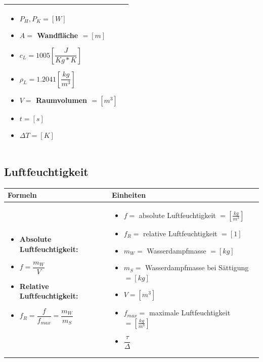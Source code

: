 \begin{table}[h!]
\begin{center}
\begin{tabular}{ | m{10cm} | m{8cm}  | }
\begin{itemize}
			\item $P_{H},P_{K}=[W]$
			\item $A=$ Wandfläche $=[m]$
			\item $c_{L}=1005[\dfrac{J}{Kg*K}]$
			\item $\rho_{L}=1.2041[\dfrac{kg}{m^{3}}]$
			\item $V=$ Raumvolumen $=[m^{3}]$
			\item $t=[s]$
			\item $\Delta T=[K]$
		\end{itemize}
		\\ \hline
	\end{tabular}
\end{center}
\end{table}

\subsection{Luftfeuchtigkeit}		%
\begin{table}[h!]
	\begin{center}
		\begin{tabular}{ | m{6cm} | m{12cm}  | }
			\hline
			Formeln & Einheiten \\ \hline
			\midrule
			\begin{itemize}
				\item \textbf{Absolute Luftfeuchtigkeit:}
				\item $f=\dfrac{m_W}{V}$
				
				\item \textbf{Relative Luftfeuchtigkeit:}
				\item $f_R=\dfrac{f}{f_{max}}=\dfrac{m_W}{m_S}$
			
			\end{itemize}
			&
			\begin{itemize}
				\item $f=$ absolute Luftfeuchtigkeit $=[\frac{kg}{m^3}]$
				\item $f_R=$ relative Luftfeuchtigkeit $=[1]$
				\item $m_W=$ Wasserdampfmasse $=[kg]$
				\item $m_S=$ Wasserdampfmasse bei Sättigung $=[kg]$
				\item $V=[m^3]$
				\item $f_{max}=$ maximale Luftfeuchtigkeit $=[\frac{kg}{m^3}]$
				\item $\dfrac{\tau}{\Delta}$
			
			\end{itemize}
			\\ \hline
		\end{tabular}
	\end{center}
\end{table}
\newpage

